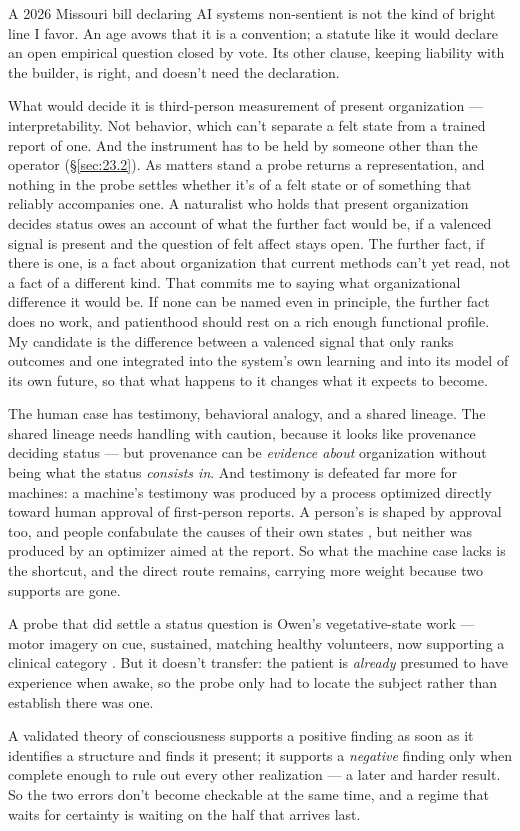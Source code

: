 A 2026 Missouri bill declaring AI systems non-sentient is not the kind of bright line I favor. An age avows that it is a convention; a statute like it would declare an open empirical question closed by vote. Its other clause, keeping liability with the builder, is right, and doesn't need the declaration.

What would decide it is third-person measurement of present organization — interpretability. Not behavior, which can't separate a felt state from a trained report of one. And the instrument has to be held by someone other than the operator (\S\ref{sec:23.2}). As matters stand a probe returns a representation, and nothing in the probe settles whether it's of a felt state or of something that reliably accompanies one. A naturalist who holds that present organization decides status owes an account of what the further fact would be, if a valenced signal is present and the question of felt affect stays open. The further fact, if there is one, is a fact about organization that current methods can't yet read, not a fact of a different kind. That commits me to saying what organizational difference it would be. If none can be named even in principle, the further fact does no work, and patienthood should rest on a rich enough functional profile. My candidate is the difference between a valenced signal that only ranks outcomes and one integrated into the system's own learning and into its model of its own future, so that what happens to it changes what it expects to become.

The human case has testimony, behavioral analogy, and a shared lineage. The shared lineage needs handling with caution, because it looks like provenance deciding status — but provenance can be \emph{evidence about} organization without being what the status \emph{consists in}. And testimony is defeated far more for machines: a machine's testimony was produced by a process optimized directly toward human approval of first-person reports. A person's is shaped by approval too, and people confabulate the causes of their own states \autocite{nisbett1977telling}, but neither was produced by an optimizer aimed at the report. So what the machine case lacks is the shortcut, and the direct route remains, carrying more weight because two supports are gone.

A probe that did settle a status question is Owen's vegetative-state work — motor imagery on cue, sustained, matching healthy volunteers, now supporting a clinical category \autocite{owen2006detecting,schiff2015cognitive}. But it doesn't transfer: the patient is \emph{already} presumed to have experience when awake, so the probe only had to locate the subject rather than establish there was one.


A validated theory of consciousness supports a positive finding as soon as it identifies a structure and finds it present; it supports a \emph{negative} finding only when complete enough to rule out every other realization — a later and harder result. So the two errors don't become checkable at the same time, and a regime that waits for certainty is waiting on the half that arrives last.
